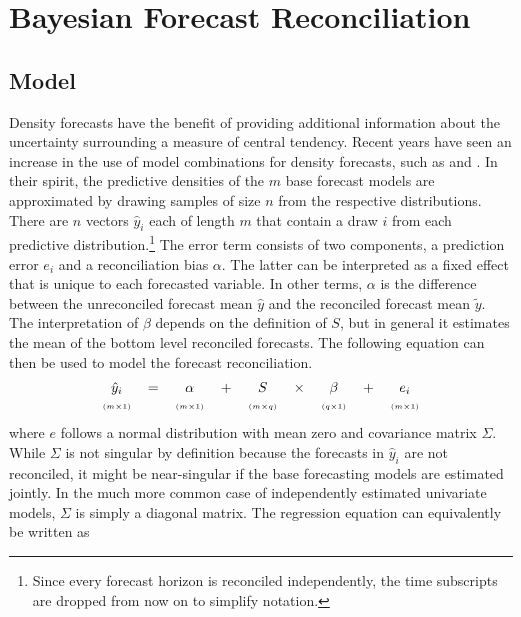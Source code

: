 \documentclass[a4paper,fleqn,11pt]{article}
\begin{document}
\clearpage

\section{Bayesian Forecast Reconciliation}
\label{sec:model}
\subsection{Model}
Density forecasts have the benefit of providing additional information about the uncertainty surrounding a measure of central tendency. Recent years have seen an increase in the use of model combinations for density forecasts, such as \cite{Kapetanios2015} and \cite{Cesur2016}. In their spirit, the predictive densities of the $m$ base forecast models are approximated by drawing samples of size $n$ from the respective distributions. There are $n$ vectors $\hat{y}_{i}$ each of length $m$ that contain a draw $i$ from each predictive distribution.\footnote{Since every forecast horizon is reconciled independently, the time subscripts are dropped from now on to simplify notation.} The error term consists of two components, a prediction error $e_{i}$ and a reconciliation bias $\alpha$. The latter can be interpreted as a fixed effect that is unique to each forecasted variable. In other terms, $\alpha$ is the difference between the unreconciled forecast mean $\hat{y}$ and the reconciled forecast mean $\tilde{y}$. The interpretation of $\beta$ depends on the definition of $S$, but in general it estimates the mean of the bottom level reconciled forecasts. The following equation can then be used to model the forecast reconciliation.
\begin{align}
\label{eq:main}
\begin{tabular}{ccccccccc}
	$\hat{y}_i$ & $=$ & $\alpha$ & + &$S$ & $\times$ & $\beta$ & $+$ & $e_i$ \\
	$\scriptscriptstyle (m\times 1)$ & & $\scriptscriptstyle (m\times 1)$  & & $ \scriptscriptstyle (m\times q) $ & & $\scriptscriptstyle (q\times 1)$ & & $\scriptscriptstyle (m\times 1)$
\end{tabular}
\end{align}
where $e$ follows a normal distribution with mean zero and covariance matrix $\Sigma$. While $\Sigma$ is not singular by definition because the forecasts in $\hat{y}_{i}$ are not reconciled, it might be near-singular if the base forecasting models are estimated jointly. In the much more common case of independently estimated univariate models, $\Sigma$ is simply a diagonal matrix. The regression equation can equivalently be written as
\end{document}
